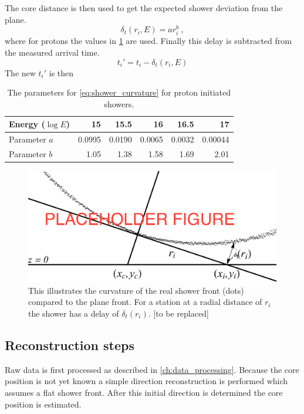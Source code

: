 The core distance is then used to get the expected shower deviation from the plane.
%
\begin{equation}\label{eq:shower_curvature}
    \delta_t(r_i, E) = a r_i^b \ ,
\end{equation}
%
where for protons the values in \cref{tab:curvature_parameters} are used. Finally this delay is subtracted from the measured arrival time.
%
\begin{equation}
    t_i' = t_i - \delta_t(r_i, E)
\end{equation}
%
The new $t_i'$ is then

\begin{table}
    \centering
    \begin{tabular}{@{}lrrrrr@{}}
        \toprule
        Energy ($\log E$) & 15     & 15.5   & 16     & 16.5   & 17      \\
        \midrule
        Parameter $a$     & 0.0995 & 0.0190 & 0.0065 & 0.0032 & 0.00044 \\
        Parameter $b$     & 1.05   & 1.38   & 1.58   & 1.69   & 2.01    \\
        \bottomrule
    \end{tabular}
    \caption{The parameters for \cref{eq:shower_curvature} for proton initiated showers.}
    \label{tab:curvature_parameters}
\end{table}

\begin{figure}
    \centering
    \includegraphics[width=0.7\linewidth]{plots/reconstructions/curvedfront.pdf}
    \caption{This illustrates the curvature of the real shower front (dots) compared to the plane front. For a station at a radial distance of $r_i$ the shower has a delay of $\delta_t(r_i)$. [to be replaced]}
    \label{fig:curved_front}
\end{figure}


\subsection{Reconstruction steps}

Raw data is first processed as described in \cref{ch:data_processing}. Because the core position is not yet known a simple direction reconstruction is performed which assumes a flat shower front. After this initial direction is determined the core position is estimated.

